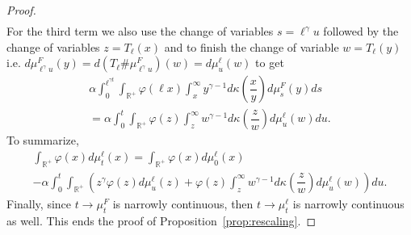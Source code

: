 \documentclass[AHL,Unicode,longabstracts,published]{cedram}
\newcommand*\dst{\displaystyle}
\renewcommand*\a{\alpha}
\newcommand*\R{\mathbb{R}}
\begin{document}
\begin{proof}
\begin{align*}
\end{align*}
For the third term we also use the change of variables $s=\ell^{\gamma}u$ followed by the change of variables $z=T_{\ell}(x)$ and to finish the change of variable $w=T_\ell (y)$ i.e. $d\mu_{\ell^{\gamma}u}^{F}(y)= d (T_{\ell} \#\mu_{\ell^{\gamma}u}^{F})(w)=d\mu_u^\ell(w)$ to get
\begin{multline*}
\a \dst\int_0^{\ell^{\gamma t}} \dst\int_{\R^+}
\varphi(\ell x)\dst\int_x^{\infty}y^{\gamma-1} d\kappa\left(\dfrac{x}{y}\right)d\mu_s^{F}(y)ds \\
=\a \dst\int_0^{t} \dst\int_{\R^+}
\varphi(z)\dst\int_z^{\infty}w^{\gamma-1} d\kappa\left(\dfrac{z}{w}\right)d\mu_u^{\ell}(w)du.
\end{multline*}
To summarize,
\begin{multline*}
\dst\int_{\R^+} \varphi(x) d\mu_t^{\ell}(x) =
\dst\int_{\R^+} \varphi(x) d\mu_0^{\ell}(x)\\
-\a \dst\int_0^{t} \dst\int_{\R^+}
\left(z^{\gamma} \varphi(z)d\mu_u^{\ell}(z)+
\varphi(z)\dst\int_z^{\infty}w^{\gamma-1} d\kappa\left(\dfrac{z}{w}\right)d\mu_u^{\ell}(w) \right)du.
\end{multline*}
Finally, since $t\to \mu_t^{F}$ is narrowly continuous, then $t\to \mu_t^{\ell}$ is narrowly continuous as well. This ends the proof of Proposition~\ref{prop:rescaling}.
\end{proof}
\end{document}
